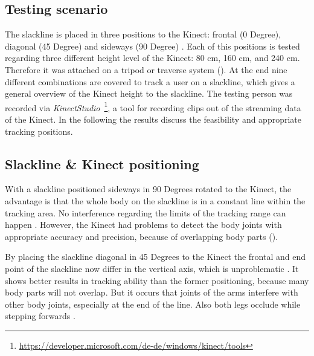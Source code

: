\subsection{Testing scenario}

The slackline is placed in three positions to the Kinect: frontal (0 Degree), diagonal (45 Degree) and sideways (90 Degree) \textbf{}. Each of this positions is tested regarding three different height level of the Kinect: 80 cm, 160 cm, and 240 cm. Therefore it was attached on a tripod or traverse system (\textbf{}). At the end nine different combinations are covered to track a user on a slackline, which gives a general overview of the Kinect height to the slackline. The testing person was recorded via \textit{KinectStudio}~\footnote{\url{https://developer.microsoft.com/de-de/windows/kinect/tools}}, a tool for recording clips out of the streaming data of the Kinect. In the following the results discuss the feasibility and appropriate tracking positions.

\subsection{Slackline \& Kinect positioning}
With a slackline positioned sideways in 90 Degrees rotated to the Kinect, the advantage is that the whole body on the slackline is in a constant line within the tracking area. No interference regarding the limits of the tracking range can happen \textbf{}. However, the Kinect had problems to detect the body joints with appropriate accuracy and precision, because of overlapping body parts (\textbf{}).

By placing the slackline diagonal in 45 Degrees to the Kinect the frontal and end point of the slackline now differ in the vertical axis, which is unproblematic  \textbf{}. 
It shows better results in tracking ability than the former positioning, because many body parts will not overlap. But it occurs that joints of the arms interfere with other body joints, especially at the end of the line. Also both legs occlude while stepping forwards \textbf{}. 

